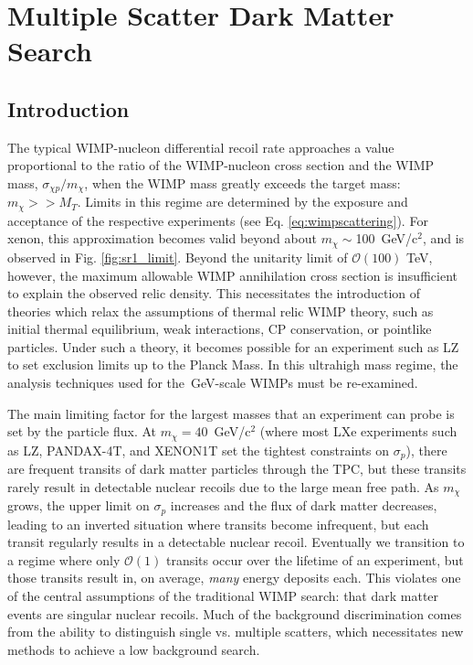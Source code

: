\chapter{Multiple Scatter Dark Matter Search}
\label{chap:tracks}
\section{Introduction}

The typical WIMP-nucleon differential recoil rate approaches a value proportional to the ratio of the WIMP-nucleon cross section and the WIMP mass, $\sigma_{\chi p}/m_\chi$, when the WIMP mass greatly exceeds the target mass:$m_\chi >> M_T$.
Limits in this regime are determined by the exposure and acceptance of the respective experiments (see Eq. \ref{eq:wimpscattering}).
For xenon, this approximation becomes valid beyond about $m_\chi \sim $100~GeV/c$^2$, and is observed in Fig. \ref{fig:sr1_limit}.
Beyond the unitarity limit of $\mathcal{O}(100)$ TeV, however, the maximum allowable WIMP annihilation cross section is insufficient to explain the observed relic density\cite{griest_unitarity_1990}.
This necessitates the introduction of theories which relax the assumptions of thermal relic WIMP theory, such as initial thermal equilibrium\cite{kolb_wimpzillas_1998}, weak interactions\cite{hochberg_simp_2022, harris_snowmass_2022}, CP conservation\cite{petraki_review_2013}, or pointlike particles\cite{gresham_astrophysical_2018}.
Under such a theory, it becomes possible for an experiment such as LZ to set exclusion limits up to  the Planck Mass.
In this ultrahigh mass regime, the analysis techniques used for the~GeV-scale WIMPs must be re-examined.

The main limiting factor for the largest masses that an experiment can probe is set by the particle flux.
At $m_\chi=40$~GeV/c$^2$ (where most LXe experiments such as LZ\cite{aalbers_first_2022}, PANDAX-4T\cite{meng_dark_2021}, and XENON1T\cite{xenon_collaboration_7_dark_2018,the_xenon_collaboration_projected_2020} set the tightest constraints on $\sigma_p$), there are frequent transits of dark matter particles through the TPC, but these transits  rarely result in detectable nuclear recoils due to the large mean free path.
As $m_\chi$ grows, the upper limit on $\sigma_p$ increases and the flux of dark matter decreases, leading to an inverted situation where transits become infrequent, but each transit regularly results in a detectable nuclear recoil.
Eventually we transition to a regime where only $\mathcal{O}(1)$ transits occur over the lifetime of an experiment, but those transits result in, on average, \textit{many} energy deposits each.
This violates one of the central assumptions of the traditional WIMP search: that dark matter events are singular nuclear recoils.
Much of the background discrimination comes from the ability to distinguish single vs. multiple scatters, which necessitates new methods to achieve a low background search.

